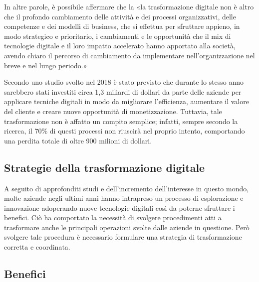 In altre parole, è possibile affermare che la «la trasformazione digitale non è altro che il profondo cambiamento delle attività e dei processi organizzativi, delle competenze e dei modelli di business, che si effettua per sfruttare appieno, in modo strategico e prioritario, i cambiamenti e le opportunità che il mix di tecnologie digitale e il loro impatto accelerato hanno apportato alla società, avendo chiaro il percorso di cambiamento da implementare nell'organizzazione nel breve e nel lungo periodo.»~\cite{linkedin_digital_transformation_definition}

Secondo uno studio svolto nel 2018 è stato previsto che durante lo stesso anno sarebbero stati investiti circa 1,3 miliardi di dollari da parte delle aziende per applicare tecniche digitali in modo da migliorare l'efficienza, aumentare il valore del cliente e creare nuove opportunità di monetizzazione. Tuttavia, tale trasformazione non è affatto un compito semplice; infatti, sempre secondo la ricerca, il 70\% di questi processi non riuscirà nel proprio intento, comportando  una perdita totale di oltre 900 milioni di dollari.~\cite{forbes_digital_transformation_fail}

\subsection{Strategie della trasformazione digitale}

A seguito di approfonditi studi e dell'incremento dell'interesse in questo mondo, molte aziende negli ultimi anni hanno intrapreso un processo di esplorazione e innovazione adoperando nuove tecnologie digitali così da poterne sfruttare i benefici. Ciò ha comportato la necessità di svolgere procedimenti atti a trasformare anche le principali operazioni svolte dalle aziende in questione. Però svolgere tale procedura è necessario formulare una strategia di trasformazione corretta e coordinata.~\cite{digital_transformation_strategies}

\subsection{Benefici}

